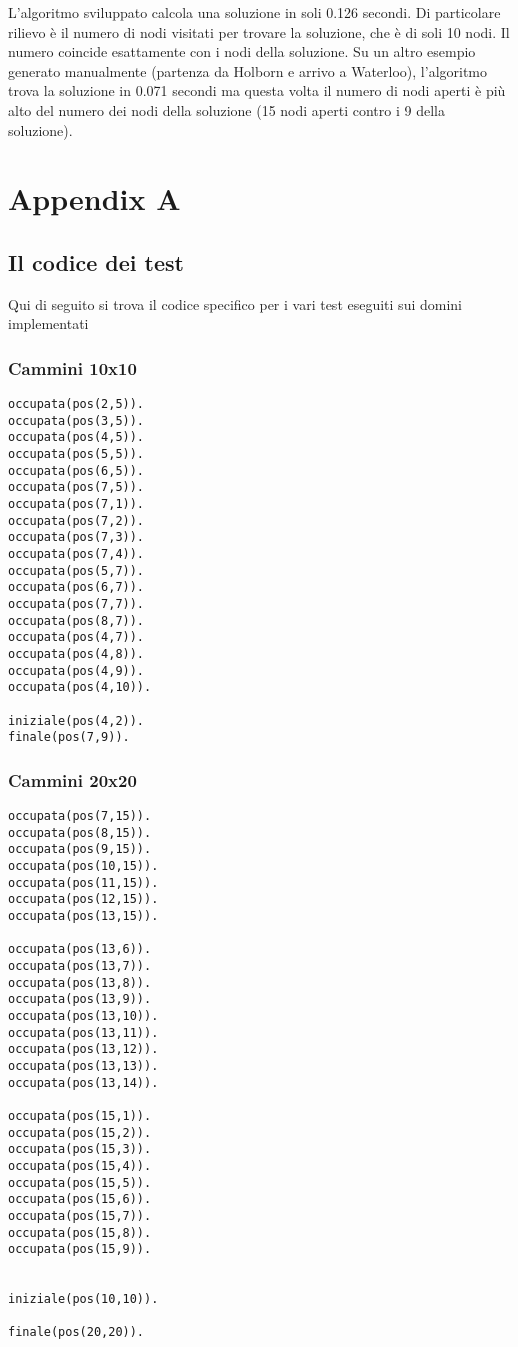 L'algoritmo sviluppato calcola una soluzione in soli 0.126 secondi. Di particolare rilievo è il numero di nodi visitati per trovare la soluzione, che è di soli 10 nodi. Il numero coincide esattamente con i nodi della soluzione. Su un altro esempio generato manualmente (partenza da Holborn e arrivo a Waterloo), l'algoritmo trova la soluzione in 0.071 secondi ma questa volta il numero di nodi aperti è più alto del numero dei nodi della soluzione (15 nodi aperti contro i 9 della soluzione).
\newpage

\appendix
\chapter{Appendix A}

\section{Il codice dei test}
Qui di seguito si trova il codice specifico per i vari test eseguiti sui domini implementati

\subsection{Cammini 10x10}

\begin{lstlisting}
occupata(pos(2,5)).
occupata(pos(3,5)).
occupata(pos(4,5)).
occupata(pos(5,5)).
occupata(pos(6,5)).
occupata(pos(7,5)).
occupata(pos(7,1)).
occupata(pos(7,2)).
occupata(pos(7,3)).
occupata(pos(7,4)).
occupata(pos(5,7)).
occupata(pos(6,7)).
occupata(pos(7,7)).
occupata(pos(8,7)).
occupata(pos(4,7)).
occupata(pos(4,8)).
occupata(pos(4,9)).
occupata(pos(4,10)).

iniziale(pos(4,2)).
finale(pos(7,9)).
\end{lstlisting}

\subsection{Cammini 20x20}

\begin{lstlisting}
occupata(pos(7,15)).
occupata(pos(8,15)).
occupata(pos(9,15)).
occupata(pos(10,15)).
occupata(pos(11,15)).
occupata(pos(12,15)).
occupata(pos(13,15)).

occupata(pos(13,6)).
occupata(pos(13,7)).
occupata(pos(13,8)).
occupata(pos(13,9)).
occupata(pos(13,10)).
occupata(pos(13,11)).
occupata(pos(13,12)).
occupata(pos(13,13)).
occupata(pos(13,14)).

occupata(pos(15,1)).
occupata(pos(15,2)).
occupata(pos(15,3)).
occupata(pos(15,4)).
occupata(pos(15,5)).
occupata(pos(15,6)).
occupata(pos(15,7)).
occupata(pos(15,8)).
occupata(pos(15,9)).


iniziale(pos(10,10)).

finale(pos(20,20)).
\end{lstlisting}

